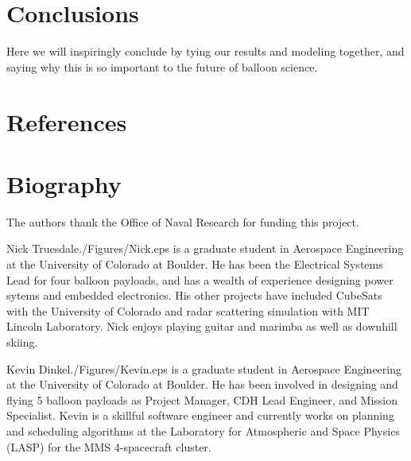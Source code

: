 \documentclass[twocolumn,letterpaper]{IEEEAerospace2012}
\newcommand{\rootdir}{./Figures/}
\begin{document}
\section{Conclusions}
Here we will inspiringly conclude by tying our results and modeling together, and saying why this is so important to the future of balloon science.

\section{References}


\section{Biography}

\appendices

\acknowledgments
The authors thank the Office of Naval Research for funding this project.


\thebiography


\begin{biographywithpic}{Nick Truesdale}{\rootdir Nick.eps}
is a graduate student in Aerospace Engineering at the University of Colorado at Boulder.
He has been the Electrical Systems Lead for four balloon payloads, and has a wealth of experience designing power sytems and embedded electronics. His other projects have included CubeSats with the University of Colorado and radar scattering simulation with MIT Lincoln Laboratory. Nick enjoys playing guitar and marimba as well as downhill skiing.
\end{biographywithpic}

\begin{biographywithpic} {Kevin Dinkel}{\rootdir Kevin.eps}
is a graduate student in Aerospace Engineering at the University of Colorado at Boulder. He has been involved in designing and flying 5 balloon payloads as Project Manager, CDH Lead Engineer, and Mission Specialist. Kevin is a skillful software engineer and currently works on planning and scheduling algorithms at the Laboratory for Atmospheric and Space Physics (LASP) for the MMS 4-spacecraft cluster.
\end{biographywithpic}
\end{document}
